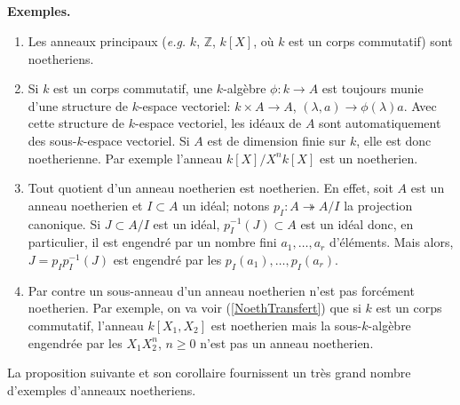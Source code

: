 \documentclass[a4paper, 12pt]{amsart}
\newcommand{\Z}{\mathbb{Z}}
\begin{document}
    \subsection{}\label{NoethEx}\textbf{Exemples.} 
      \begin{enumerate}[leftmargin=* ,parsep=0cm,itemsep=0cm,topsep=0cm]
     \item  Les anneaux principaux (\textit{e.g.} $k$, $\Z$, $k[X]$, o\`u $k$ est un corps commutatif) sont noetheriens. 
     \item  Si $k$ est un corps commutatif, une  $k$-algèbre $\phi:k\rightarrow A$ est toujours munie d'une structure de $k$-espace vectoriel: $k\times A\rightarrow A$, $(\lambda,a)\rightarrow \phi(\lambda)a$. Avec cette structure de $k$-espace vectoriel, les idéaux de $A$ sont automatiquement des sous-$k$-espace vectoriel. Si $A$ est de dimension finie sur $k$, elle est donc noetherienne. Par exemple l'anneau $k[X]/X^nk[X]$ est un  noetherien. 
     \item  Tout quotient d'un anneau noetherien est noetherien. En effet, soit $A$ est un anneau noetherien et $I\subset A$  un idéal; notons $p_I:A\twoheadrightarrow A/I$ la projection canonique. Si $J\subset A/I$ est un idéal, $p_I^{-1}(J)\subset A$ est un idéal donc, en particulier, il est engendré par un nombre fini $a_1,\dots, a_r$ d'éléments. Mais alors, $J=p_Ip_I^{-1}(J)$ est engendré par les  $p_I(a_1),\dots, p_I(a_r)$.
     \item Par contre un sous-anneau d'un anneau noetherien n'est pas forcément noetherien. Par exemple, on va voir (\ref{NoethTransfert}) que si $k$ est un corps commutatif, l'anneau $k[X_1,X_2]$ est noetherien mais la sous-$k$-algèbre engendrée par les $  X_1X_2^n$, $n\geq 0$ n'est pas un anneau noetherien.\\
\end{enumerate}
    
\noindent La proposition suivante et son corollaire fournissent un très grand nombre d'exemples d'anneaux noetheriens.   
    
\end{document}
